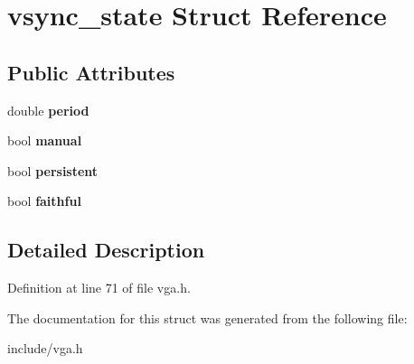 \hypertarget{structvsync__state}{\section{vsync\-\_\-state Struct Reference}
\label{structvsync__state}
}
\subsection*{Public Attributes}
\begin{DoxyCompactItemize}
\item 
\hypertarget{structvsync__state_ab31e356f8dda57db35c1424304ac5f44}{double {\bfseries period}}\label{structvsync__state_ab31e356f8dda57db35c1424304ac5f44}

\item 
\hypertarget{structvsync__state_a464f94268847e463a0ec9b7657661a86}{bool {\bfseries manual}}\label{structvsync__state_a464f94268847e463a0ec9b7657661a86}

\item 
\hypertarget{structvsync__state_a43ed386d0d457124256caad15f108bac}{bool {\bfseries persistent}}\label{structvsync__state_a43ed386d0d457124256caad15f108bac}

\item 
\hypertarget{structvsync__state_a23b2944857c4a4191aa0c73a7fc1929b}{bool {\bfseries faithful}}\label{structvsync__state_a23b2944857c4a4191aa0c73a7fc1929b}

\end{DoxyCompactItemize}


\subsection{Detailed Description}


Definition at line 71 of file vga.\-h.



The documentation for this struct was generated from the following file\-:\begin{DoxyCompactItemize}
\item 
include/vga.\-h\end{DoxyCompactItemize}
